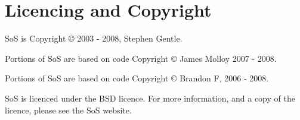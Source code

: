 \section{Licencing and Copyright}

SoS is Copyright © 2003 - 2008, Stephen Gentle.

Portions of SoS are based on code Copyright © James Molloy 2007 - 2008.

Portions of SoS are based on code Copyright © Brandon F, 2006 - 2008.

SoS is licenced under the BSD licence. For more information, and a copy of the licence, 
please see the SoS website.

